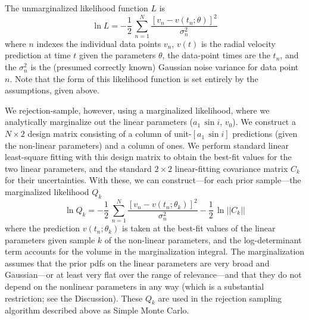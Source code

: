 \documentclass[12pt, preprint]{aastex6}
\newcommand{\asini}{\ensuremath{a_1\,\sin i}}
\begin{document}
The unmarginalized likelihood function $L$ is
\begin{equation}
\ln L = -\frac{1}{2}\,\sum_{n=1}^N \frac{[v_n - v(t_n;\theta)]^2}{\sigma_n^2}
\end{equation}
where $n$ indexes the individual data points $v_n$, $v(t)$ is the
radial velocity prediction at time $t$ given the parameters $\theta$, the
data-point times are the $t_n$, and the $\sigma_n^2$ is the (presumed
correctly known) Gaussian noise variance for data point $n$.
Note that the form of this likelihood function is set entirely by
the assumptions, given above.

We rejection-sample, however, using a marginalized likelihood, where
we analytically marginalize out the linear parameters ($\asini$,
$v_0$).
We construct a $N\times 2$ design matrix consisting of a column of
unit-$[\asini]$ predictions (given the non-linear parameters) and a
column of ones.
We perform standard linear least-square fitting with this design
matrix to obtain the best-fit values for the two linear parameters,
and the standard $2\times 2$ linear-fitting covariance matrix $C_k$ for their
uncertainties.
With these, we can construct---for each prior sample---the marginalized likelihood $Q_k$
\begin{equation}
\ln Q_k = -\frac{1}{2}\,\sum_{n=1}^N \frac{[v_n - v(t_n;\theta_k)]^2}{\sigma_n^2} -\frac{1}{2}\,\ln ||C_k||
\end{equation}
where the prediction $v(t_n;\theta_k)$ is taken at the best-fit values
of the linear parameters given sample $k$ of the non-linear
parameters, and the log-determinant term accounts for the volume in
the marginalization integral.
The marginalization assumes that the prior pdfs on the linear parameters
are very broad and Gaussian---or
at least very flat over the range of relevance---and that they do not depend
on the nonlinear parameters in any way (which is a substantial restriction;
see the Discussion).
These $Q_k$ are used in the rejection sampling algorithm described above
as Simple Monte Carlo.
\end{document}
